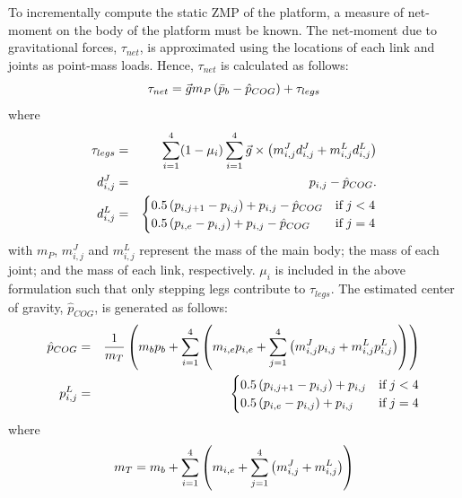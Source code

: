 		To incrementally compute the static ZMP of the platform, a measure of net-moment on the body of the platform must be known. The net-moment due to gravitational forces, $\tau_{net}$, is approximated using the locations of each link and joints as point-mass loads. Hence, $\tau_{net}$ is calculated as follows:
			\begin{equation}
				\tau_{net} 	= \vec{g} m_{P}  \left(\bar{p}_{b}-\hat{p}_{COG} \right)	+ \tau_{legs}
				\label{eq::NetMoment}
			\end{equation}
		where
			\begin{eqnarray*}
					\tau_{legs}		& = & \sum_{i=1}^{4} (1-\mu_{i})  \sum_{i=1}^{4} \vec{g} \times  \left( m_{i,j}^{J} d_{i,j}^{J} + m_{i,j}^{L} d_{i,j}^{L} \right)	\nonumber \\
					d_{i,j}^{J} 	& = & {{p}_{i,j}-\hat{p}_{COG}.} \nonumber \\														
					d_{i,j}^{L} 	& = &
					\begin{cases}
					{ 0.5  \left({p}_{i,j+1}-{p}_{i,j}\right) + {p}_{i,j} - \hat{p}_{COG}} 	& \text{if}\hspace{1mm} j < 4 \\
					{ 0.5  \left({p}_{i,e}-{p}_{i,j}\right) + {p}_{i,j} - \hat{p}_{COG}} 		& \text{if}\hspace{1mm} j = 4
					\end{cases} \nonumber
				\label{eq::Levers}
			\end{eqnarray*}
		with $m_{P}$, $m_{i,j}^{J}$ and $m_{i,j}^{L}$ represent the mass of the main body; the mass of each joint; and the mass of each link, respectively. $\mu_{i}$ is included in the above formulation such that only stepping legs contribute to  $\tau_{legs}$. The estimated center of gravity, $\hat{p}_{COG}$, is generated as follows:
			\begin{eqnarray*}
				\hat{p}_{COG} 	& = & \frac{1}{m_{T}}\left( m_{b}p_{b} + \sum_{i=1}^{4} \left(m_{i,e}{p}_{i,e} + \sum_{j=1}^{4} \left(  m_{i,j}^{J}{p}_{i,j} +  m_{i,j}^{L}{p}_{i,j}^{L} \right) \right)\right) 	\nonumber \\
				{p}_{i,j}^{L} 	& = & 
					\begin{cases}
					{ 0.5  \left({p}_{i,j+1}-{p}_{i,j}\right) + {p}_{i,j} } 	& \text{if}\hspace{1mm} j < 4 \\
					{ 0.5  \left({p}_{i,e}-{p}_{i,j}\right) + {p}_{i,j} } 		& \text{if}\hspace{1mm} j = 4
					\end{cases} \nonumber
				\label{eq::cog_estimate}
			\end{eqnarray*}
		where
			\begin{equation}
				m_{T} = m_{b} + \sum_{i=1}^{4} \left(m_{i,e} + \sum_{j=1}^{4} \left(  m_{i,j}^{J} +  m_{i,j}^{L} \right) \right)
			\end{equation}

